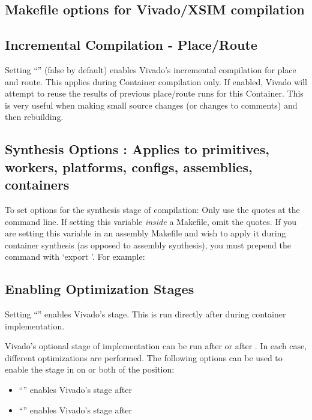 \begin{flushleft}
\section{Makefile options for Vivado/XSIM compilation}
\subsection{Incremental Compilation - Place/Route}
Setting ``'' (false by default) enables Vivado's incremental compilation for place and route. This applies during Container compilation only. If enabled, Vivado will attempt to reuse the results of previous place/route runs for this Container. This is very useful when making small source changes (or changes to comments) and then rebuilding.

\subsection{Synthesis Options : Applies to primitives, workers, platforms, configs, assemblies, containers}
\label{synth-opt}
To set options for the synthesis stage of compilation:\newline
{}\newline
Only use the quotes at the command line. If setting this variable \textit{inside} a Makefile, omit the quotes. If you are setting this variable in an assembly Makefile and wish to apply it during container synthesis (as opposed to assembly synthesis), you must prepend the command with `export '. For example:\newline
{}\newline

\subsection{Enabling Optimization Stages}
Setting ``'' enables Vivado's  stage. This is run directly after  during container implementation.\newline

Vivado's optional  stage of implementation can be run after  or after . In each case, different optimizations are performed. The following options can be used to enable the  stage in on or both of the position:\newline
\begin{itemize}
\item ``'' enables Vivado's  stage after 
\item ``'' enables Vivado's  stage after 
\end{itemize}


\end{flushleft}
